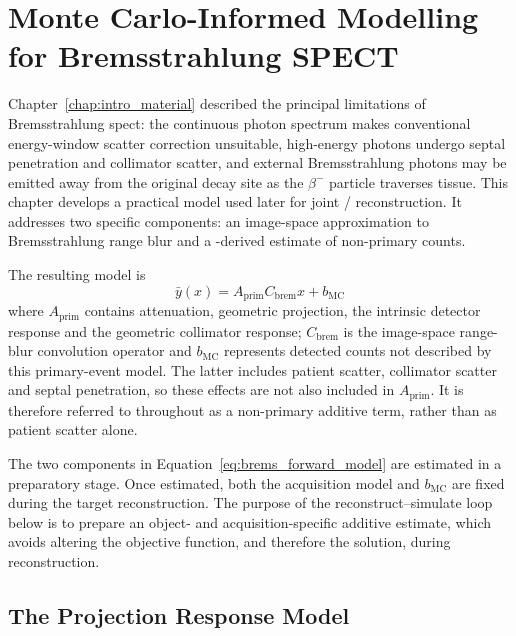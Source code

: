 \chapter{Monte Carlo-Informed Modelling for \texorpdfstring{}{90Y} Bremsstrahlung SPECT}
\label{chapterlabel3}

Chapter~\ref{chap:intro_material} described the principal limitations of  Bremsstrahlung \gls{spect}: the continuous photon spectrum makes conventional energy-window scatter correction unsuitable, high-energy photons undergo septal penetration and collimator scatter, and external Bremsstrahlung photons may be emitted away from the original decay site as the $\beta^-$ particle traverses tissue. This chapter develops a practical  model used later for joint / reconstruction. It addresses two specific components: an image-space approximation to Bremsstrahlung range blur and a -derived estimate of non-primary counts.

The resulting model is
\begin{equation} \label{eq:brems_forward_model}
    \bar y(x) = A_{\mathrm{prim}}C_{\mathrm{brem}}x+b_{\mathrm{MC}}
\end{equation}
where $A_{\mathrm{prim}}$ contains attenuation, geometric projection, the intrinsic detector response and the geometric collimator response; $C_{\mathrm{brem}}$ is the image-space range-blur convolution operator and $b_{\mathrm{MC}}$ represents detected counts not described by this primary-event model. The latter includes patient scatter, collimator scatter and septal penetration, so these effects are not also included in $A_{\mathrm{prim}}$. It is therefore referred to throughout as a non-primary additive term, rather than as patient scatter alone.

The two components in Equation~\ref{eq:brems_forward_model} are estimated in a preparatory stage. Once estimated, both the acquisition model and $b_{\mathrm{MC}}$ are fixed during the target reconstruction. The purpose of the reconstruct--simulate loop below is to prepare an object- and acquisition-specific additive estimate, which avoids altering the objective function, and therefore the solution, during reconstruction.


\section{The  Projection Response Model}
\label{sec:brem_range_blur}

